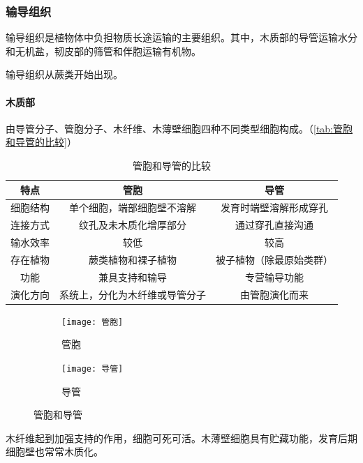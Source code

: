 	\subsubsection{输导组织}

	输导组织是植物体中负担物质长途运输的主要组织。其中，木质部的导管运输水分和无机盐，韧皮部的筛管和伴胞运输有机物。
	
	输导组织从蕨类开始出现。
	
	\paragraph{木质部}
	
	由导管分子、管胞分子、木纤维、木薄壁细胞四种不同类型细胞构成。（\autoref{tab:管胞和导管的比较}）
	
	\begin{table}[htbp]
		\centering
		\begin{tabularx}{\textwidth}{|c|C|c|}
			\hline
			特点 & 管胞 & 导管 \\ \hline
			细胞结构 & 单个细胞，端部细胞壁不溶解 & 发育时端壁溶解形成穿孔 \\ \hline
			连接方式 & 纹孔及未木质化增厚部分 & 通过穿孔直接沟通 \\ \hline
			输水效率 & 较低 & 较高 \\ \hline
			存在植物 & 蕨类植物和裸子植物 & 被子植物（除最原始类群） \\ \hline
			功能 & 兼具支持和输导 & 专营输导功能 \\ \hline
			演化方向 & 系统上，分化为木纤维或导管分子 & 由管胞演化而来 \\ \hline
		\end{tabularx}
		\caption{管胞和导管的比较}
		\label{tab:管胞和导管的比较}
	\end{table}
	
	\begin{figure}[htbp]
		\centering
		\begin{subfigure}{0.6\textwidth}
			\texttt{[image: 管胞]}
			\caption{管胞}
		\end{subfigure}

		\begin{subfigure}{0.45\textwidth}
			\texttt{[image: 导管]}
			\caption{导管}
		\end{subfigure}
		\caption{管胞和导管}
		\label{fig:管胞和导管}
	\end{figure}
	
	木纤维起到加强支持的作用，细胞可死可活。木薄壁细胞具有贮藏功能，发育后期细胞壁也常常木质化。
	
